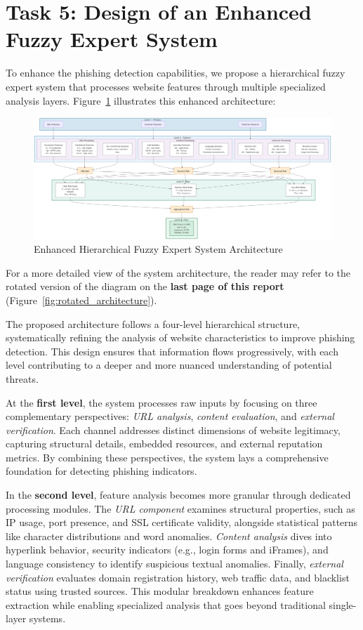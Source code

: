 \documentclass{article}
\begin{document}
\section{Task 5: Design of an Enhanced Fuzzy Expert System}

To enhance the phishing detection capabilities, we propose a hierarchical fuzzy expert system that processes website features through multiple specialized analysis layers. Figure~\ref{fig:enhanced_architecture} illustrates this enhanced architecture:

\begin{figure}[H]
    \centering
    \includegraphics[width=1\textwidth]{figures/system_architecture.png}
    \caption{Enhanced Hierarchical Fuzzy Expert System Architecture}
    \label{fig:enhanced_architecture}
\end{figure}

For a more detailed view of the system architecture, the reader may refer to the rotated version of the diagram on the \textbf{last page of this report} (Figure~\ref{fig:rotated_architecture}).

The proposed architecture follows a four-level hierarchical structure, systematically refining the analysis of website characteristics to improve phishing detection. This design ensures that information flows progressively, with each level contributing to a deeper and more nuanced understanding of potential threats.

At the \textbf{first level}, the system processes raw inputs by focusing on three complementary perspectives: \textit{URL analysis}, \textit{content evaluation}, and \textit{external verification}. Each channel addresses distinct dimensions of website legitimacy, capturing structural details, embedded resources, and external reputation metrics. By combining these perspectives, the system lays a comprehensive foundation for detecting phishing indicators.

In the \textbf{second level}, feature analysis becomes more granular through dedicated processing modules. The \textit{URL component} examines structural properties, such as IP usage, port presence, and SSL certificate validity, alongside statistical patterns like character distributions and word anomalies. \textit{Content analysis} dives into hyperlink behavior, security indicators (e.g., login forms and iFrames), and language consistency to identify suspicious textual anomalies. Finally, \textit{external verification} evaluates domain registration history, web traffic data, and blacklist status using trusted sources. This modular breakdown enhances feature extraction while enabling specialized analysis that goes beyond traditional single-layer systems.
\end{document}
